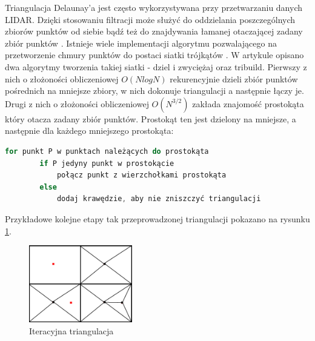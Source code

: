 Triangulacja Delaunay'a jest często wykorzystywana przy przetwarzaniu danych LIDAR. Dzięki stosowaniu filtracji może służyć do oddzielania poszczególnych
zbiorów punktów od siebie \cite{koziol2007} bądź też do znajdywania łamanej otaczającej zadany zbiór punktów \cite{website:HumanGeoBlog}.
Istnieje wiele implementacji algorytmu pozwalającego na przetworzenie chmury punktów do postaci siatki trójkątów \cite{Lee1980,Dwyer1987,jiang2010}.
W artykule \cite{Lee1980} opisano dwa algorytmy tworzenia takiej siatki - dziel i zwyciężaj oraz tribuild. Pierwszy z nich o złożoności obliczeniowej
$O(N log N)$ rekurencyjnie dzieli zbiór punktów pośrednich na mniejsze zbiory, w nich dokonuje triangulacji a następnie łączy je.
Drugi z nich o złożoności obliczeniowej $O(N^{3/2})$ zakłada znajomość prostokąta który otacza zadany zbiór punktów.
Prostokąt ten jest dzielony na mniejsze, a następnie dla każdego mniejszego prostokąta:

\begin{lstlisting}[frame=L, language=JavaScript, label={lis:triangulacja}, caption={Tworzenie triangulacji wewnątrz małego zbioru}]
    for punkt P w punktach należących do prostokąta
        if P jedyny punkt w prostokącie
            połącz punkt z wierzchołkami prostokąta
        else
            dodaj krawędzie, aby nie zniszczyć triangulacji
\end{lstlisting}

Przykładowe kolejne etapy tak przeprowadzonej triangulacji pokazano na rysunku \ref{fig:iter_triangulacja}.

\begin{figure}[h!]
    \centering
    \includegraphics[width=0.4\textwidth]{img/iter_triangulacja.jpg}
    \caption{Iteracyjna triangulacja}
    \label{fig:iter_triangulacja}
\end{figure}

